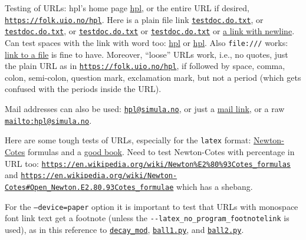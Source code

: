 \documentclass[%
oneside,                 %
final,                   %
10pt]{article}
\theoremstyle{definition}
\begin{document}
\begin{enumerate}
Testing of URLs: hpl's home page \href{{https://folk.uio.no/hpl}}{hpl}, or
the entire URL if desired, \href{{https://folk.uio.no/hpl}}{\nolinkurl{https://folk.uio.no/hpl}}.  Here is a
plain file link \href{{testdoc.do.txt}}{\nolinkurl{testdoc.do.txt}}, or \href{{testdoc.do.txt}}{\nolinkurl{testdoc.do.txt}}, or
\href{{testdoc.do.txt}}{\nolinkurl{testdoc.do.txt}} or \href{{testdoc.do.txt}}{\nolinkurl{testdoc.do.txt}} or \href{{testdoc.do.txt}}{a link with
newline}. Can test spaces with the link with word
too: \href{{https://folk.uio.no/hpl}}{hpl} or \href{{https://folk.uio.no/hpl}}{hpl}. Also \texttt{file:///} works: \href{{file:///home/hpl/vc/doconce/doc/demos/manual/manual.html}}{link to a
file} is
fine to have. Moreover, ``loose'' URLs work, i.e., no quotes, just
the plain URL as in \href{{https://folk.uio.no/hpl}}{\nolinkurl{https://folk.uio.no/hpl}}, if followed by space, comma,
colon, semi-colon, question mark, exclamation mark, but not a period
(which gets confused with the periods inside the URL).

Mail addresses can also be used: \href{{mailto:hpl@simula.no}}{\nolinkurl{hpl@simula.no}}, or just a \href{{mailto:hpl@simula.no}}{mail link}, or a raw \href{{mailto:hpl@simula.no}}{\nolinkurl{mailto:hpl@simula.no}}.

Here are some tough tests of URLs, especially for the \texttt{latex} format:
\href{{https://en.wikipedia.org/wiki/Newton%E2%80%93Cotes_formulas}}{Newton-Cotes} formulas
and a \href{{https://www.springer.com/mathematics/computational+science+%26+engineering/book/978-3-642-23098-1}}{good book}. Need to test
Newton-Cotes with percentage in URL too:
\href{{https://en.wikipedia.org/wiki/Newton%E2%80%93Cotes_formulas}}{\nolinkurl{https://en.wikipedia.org/wiki/Newton\%E2\%80\%93Cotes_formulas}}
and \href{{https://en.wikipedia.org/wiki/Newton-Cotes#Open_Newton.E2.80.93Cotes_formulae}}{\nolinkurl{https://en.wikipedia.org/wiki/Newton-Cotes\#Open_Newton.E2.80.93Cotes_formulae}} which has a shebang.

For the \texttt{--device=paper} option it is important to test that URLs with
monospace font link text get a footnote
(unless the \Verb!--latex_no_program_footnotelink!
is used), as in this reference to
\href{{https://github.com/hplgit/INF5620/tree/gh-pages/src/decay/experiments/decay_mod.py}}{\nolinkurl{decay_mod}}, \href{{https://tinyurl.com/pwyasaa/formulas.ball1.py}}{\nolinkurl{ball1.py}},
and \href{{https://tinyurl.com/pwyasaa/formulas.ball2.py}}{\nolinkurl{ball2.py}}.



\end{enumerate}
\end{document}
